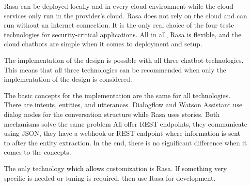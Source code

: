 Rasa can be deployed locally and in every cloud environment while the cloud services only run in the provider's cloud.
Rasa does not rely on the cloud and can run without an internet connection. 
It is the only real choice of the four teste technologies for security-critical applications.
All in all, Rasa is flexible, and the cloud chatbots are simple when it comes to deployment and setup.

The implementation of the design is possible with all three chatbot technologies.
This means that all three technologies can be recommended when only the implementation of the design is considered.

The basic concepts for the implementation are the same for all technologies.
There are intents, entities, and utterances.
Dialogflow and Watson Assistant use dialog nodes for the conversation structure while Rasa uses stories. 
Both mechanisms solve the same problem
All offer REST endpoints, they communicate using JSON, they have a webhook or REST endpoint where information is sent to after the entity extraction.
In the end, there is no significant difference when it comes to the concepts.

The only technology which allows customization is Rasa.
If something very specific is needed or tuning is required, then use Rasa for development.

